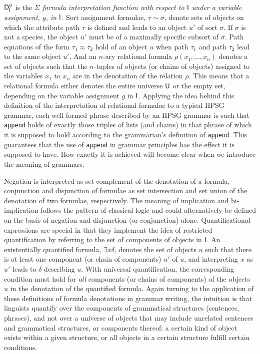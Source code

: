 \documentclass[output=paper
                ,modfonts
                ,nonflat
	        ,collection
	        ,collectionchapter
	        ,collectiontoclongg
 	        ,biblatex
                ,babelshorthands
                ,newtxmath
                ,draftmode
                ,colorlinks, citecolor=brown
]{./langsci/langscibook}
\begin{document}
{{$\mathsf{D}_{\mathsf{I}}^g$ is the \emph{$\Sigma$ formula interpretation function with
  respect to $\mathsf{I}$ under a variable assignment, $g$, in $\mathsf{I}$}.
Sort assignment formulae, $\tau\sim\sigma$, denote sets of objects on
which the attribute path $\tau$ is defined and leads to an object $u'$
of sort $\sigma$. If $\sigma$ is not a species, the object $u'$ must
be of a maximally specific subsort of $\sigma$. Path equations of the
form $\tau_1 \approx \tau_2$ hold of an object $u$ when path
$\tau_1$ and path $\tau_2$ lead to the same object $u'$. And an
$n$-ary relational formula $\rho(x_1,\ldots,x_n)$ denotes a set of
objects such that the $n$-tuples of objects (or chains of objects)
assigned to the variables $x_1$ to $x_n$ are in the denotation of the
relation $\rho$. This means that a relational formula either denotes
the entire universe $\mathsf{U}$ or the empty set, depending on the
variable assignment $g$ in $\mathsf{I}$. Applying
the idea behind this definition of the interpretation of relational
formulae to a typical HPSG grammar, each well formed phrase described
by an HPSG grammar is such that \texttt{append} holds of exactly those
triples of lists (and chains) in that phrase of which it is supposed
to hold according to the grammarian's definition of
\texttt{append}. This guarantees that the use of \texttt{append}
in grammar principles has the effect it is supposed to have. How exactly
it is achieved will become clear when we introduce the meaning of grammars.

Negation is interpreted as set complement of the denotation of a
formula, conjunction and disjunction of formulae as set intersection
and set union of the denotation of two formulae, respectively. The
meaning of implication and bi-implication follows the pattern of
classical logic and could alternatively be defined on the basis of
negation and disjunction (or conjunction) alone. Quantificational
expressions are special in that they implement the idea of restricted
quantification by referring to the set of components of objects in
$\mathsf{I}$.  An existentially quantified formula, $\exists x\delta$,
denotes the set of objects $u$ such that there is at least one
component (or chain of components) $u'$ of $u$, and interpreting $x$
as $u'$ leads to $\delta$ describing $u$.  With universal
quantification, the corresponding condition must hold for \emph{all}
components (or chains of components) of the objects $u$ in the denotation
of the quantified formula. Again turning to the
application of these definitions of formula denotations in grammar
writing, the intuition is that linguists quantify over the components
of grammatical structures (sentences, phrases), and not over a
universe of objects that may include unrelated sentences and
grammatical structures, or components thereof: a certain kind of
object exists within a given structure, or all objects in a certain
structure fulfill certain conditions.


}}
\end{document}
